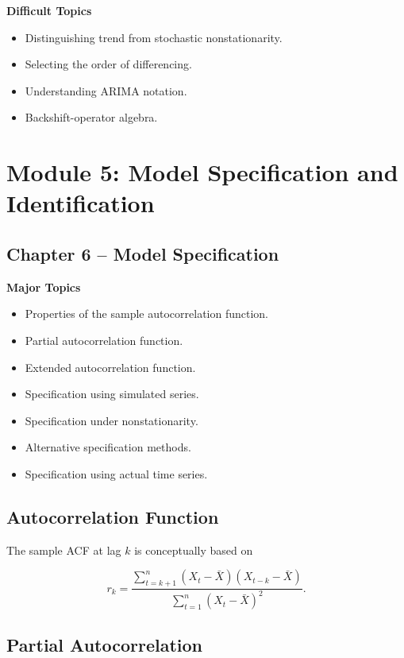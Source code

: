 \documentclass[11pt,a4paper]{article}
\begin{document}
\textbf{Difficult Topics}

\begin{itemize}
    \item Distinguishing trend from stochastic nonstationarity.
    \item Selecting the order of differencing.
    \item Understanding ARIMA notation.
    \item Backshift-operator algebra.
\end{itemize}

\section{Module 5: Model Specification and Identification}

\subsection{Chapter 6 -- Model Specification}

\textbf{Major Topics}

\begin{itemize}
    \item Properties of the sample autocorrelation function.
    \item Partial autocorrelation function.
    \item Extended autocorrelation function.
    \item Specification using simulated series.
    \item Specification under nonstationarity.
    \item Alternative specification methods.
    \item Specification using actual time series.
\end{itemize}

\subsection{Autocorrelation Function}

The sample ACF at lag $k$ is conceptually based on

\[
r_k
=
\frac{
\sum_{t=k+1}^{n}(X_t-\bar X)(X_{t-k}-\bar X)
}{
\sum_{t=1}^{n}(X_t-\bar X)^2
}.
\]

\subsection{Partial Autocorrelation}
\end{document}
